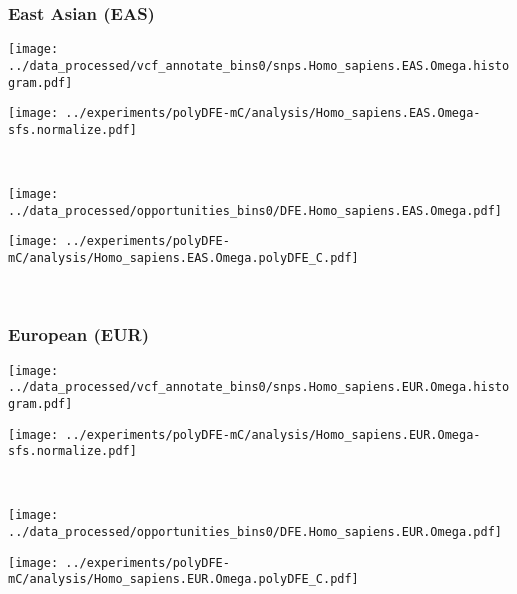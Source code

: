 \subsubsection{East Asian (EAS)}

\begin{minipage}{0.49\linewidth}
    \texttt{[image: ../data\_processed/vcf\_annotate\_bins0/snps.Homo\_sapiens.EAS.Omega.histogram.pdf]}
\end{minipage}
\begin{minipage}{0.49\linewidth}
    \texttt{[image: ../experiments/polyDFE-mC/analysis/Homo\_sapiens.EAS.Omega-sfs.normalize.pdf]}
\end{minipage}
\\
\begin{minipage}{0.49\linewidth}
    \texttt{[image: ../data\_processed/opportunities\_bins0/DFE.Homo\_sapiens.EAS.Omega.pdf]}
\end{minipage}
\begin{minipage}{0.49\linewidth}
    \texttt{[image: ../experiments/polyDFE-mC/analysis/Homo\_sapiens.EAS.Omega.polyDFE\_C.pdf]}
\end{minipage}
\\

\subsubsection{European (EUR)}

\begin{minipage}{0.49\linewidth}
    \texttt{[image: ../data\_processed/vcf\_annotate\_bins0/snps.Homo\_sapiens.EUR.Omega.histogram.pdf]}
\end{minipage}
\begin{minipage}{0.49\linewidth}
    \texttt{[image: ../experiments/polyDFE-mC/analysis/Homo\_sapiens.EUR.Omega-sfs.normalize.pdf]}
\end{minipage}
\\
\begin{minipage}{0.49\linewidth}
    \texttt{[image: ../data\_processed/opportunities\_bins0/DFE.Homo\_sapiens.EUR.Omega.pdf]}
\end{minipage}
\begin{minipage}{0.49\linewidth}
    \texttt{[image: ../experiments/polyDFE-mC/analysis/Homo\_sapiens.EUR.Omega.polyDFE\_C.pdf]}
\end{minipage}
\\

